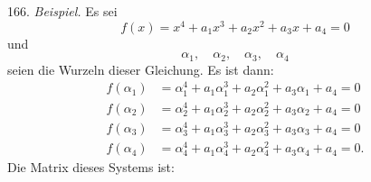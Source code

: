 166. \textit{Beispiel.} Es sei
\[
f(x) = x^4 + a_1 x^3 + a_2 x^2 + a_3 x + a_4 = 0
\]
und
\[
\alpha_1, \quad \alpha_2, \quad \alpha_3, \quad \alpha_4
\]
seien die Wurzeln dieser Gleichung. Es ist dann:
\[
\begin{aligned}
f(\alpha_1) &= \alpha_1^4 + a_1\alpha_1^3 + a_2\alpha_1^2 + a_3\alpha_1 + a_4 = 0 \\
f(\alpha_2) &= \alpha_2^4 + a_1\alpha_2^3 + a_2\alpha_2^2 + a_3\alpha_2 + a_4 = 0 \\
f(\alpha_3) &= \alpha_3^4 + a_1\alpha_3^3 + a_2\alpha_3^2 + a_3\alpha_3 + a_4 = 0 \\
f(\alpha_4) &= \alpha_4^4 + a_1\alpha_4^3 + a_2\alpha_4^2 + a_3\alpha_4 + a_4 = 0.
\end{aligned}
\]
Die Matrix dieses Systems ist:


